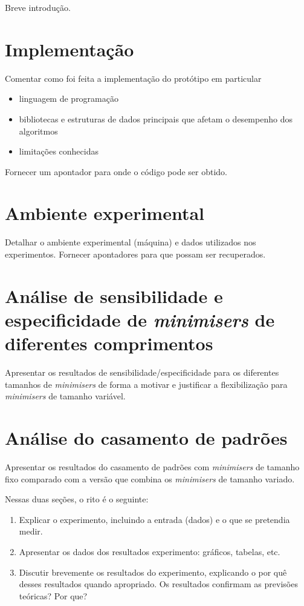 \documentclass[bsc, oneside, scr, 12pt]{ufpethesis}
\newcommand{\minimisers}{\textit{minimisers}\/\xspace}
\begin{document}
Breve introdução.

\section{Implementação}

Comentar como foi feita a implementação do protótipo em particular
\begin{itemize}
\item  linguagem de programação
\item  bibliotecas e estruturas de dados principais que afetam o desempenho dos algoritmos
\item limitações conhecidas
\end{itemize}

Fornecer um apontador para onde o código pode ser obtido.


\section{Ambiente experimental}

Detalhar o ambiente experimental (máquina) e dados utilizados nos experimentos. Fornecer apontadores para que possam ser recuperados. 

\section{Análise de sensibilidade e especificidade de \minimisers de diferentes comprimentos}

Apresentar os resultados de sensibilidade/especificidade para os diferentes tamanhos de \minimisers de forma a motivar e justificar a flexibilização para  \minimisers de tamanho variável.


\section{Análise do casamento de padrões}

Apresentar os resultados do casamento de padrões com \minimisers de tamanho fixo comparado com a versão que combina os \minimisers de tamanho variado.


Nessas duas seções, o rito é o seguinte:

\begin{enumerate}
\item Explicar o experimento, incluindo a entrada (dados) e o que se pretendia medir.
\item Apresentar os dados dos resultados experimento: gráficos, tabelas, etc.
\item Discutir brevemente os resultados do experimento, explicando o por quê desses resultados quando apropriado. Os resultados confirmam as previsões teóricas? Por que?
\end{enumerate}
\end{document}
